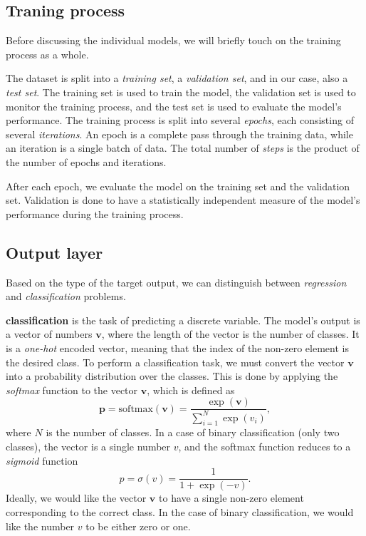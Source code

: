 \subsection{Traning process}
\label{sec:training_process}
Before discussing the individual models, we will briefly touch on the training process as a whole.

The dataset is split into a \emph{training set}, a \emph{validation set}, and in our case, also a \emph{test set}.
The training set is used to train the model, the validation set is used to monitor the training process, and the test set is used to evaluate the model's performance.
The training process is split into several \emph{epochs}, each consisting of several \emph{iterations}.
An epoch is a complete pass through the training data, while an iteration is a single batch of data.
The total number of \emph{steps} is the product of the number of epochs and iterations. 

After each epoch, we evaluate the model on the training set and the validation set.
Validation is done to have a statistically independent measure of the model's performance during the training process.


\subsection{Output layer}
\label{sec:output_layer}
Based on the type of the target output, we can distinguish between \emph{regression} and \emph{classification} problems.

\textbf{classification} is the task of predicting a discrete variable.
The model's output is a vector of numbers $\pmb{v}$, where the length of the vector is the number of classes.
It is a \emph{one-hot} encoded vector, meaning that the index of the non-zero element is the desired class.
To perform a classification task, we must convert the vector $\pmb{v}$ into a probability distribution over the classes.
This is done by applying the \emph{softmax} function to the vector $\pmb{v}$, which is defined as
\begin{equation}
    \pmb{p} = \mathrm{softmax}(\pmb{v}) = \frac{\exp(\pmb{v})}{\sum_{i=1}^N \exp(v_i)},
\end{equation}
where $N$ is the number of classes.
In a case of binary classification (only two classes), the vector is a single number $v$, and the softmax function reduces to a \emph{sigmoid} function
\begin{equation}
    p = \sigma(v) = \frac{1}{1 + \exp(-v)}.
\end{equation}
Ideally, we would like the vector $\pmb{v}$ to have a single non-zero element corresponding to the correct class. 
In the case of binary classification, we would like the number $v$ to be either zero or one.

